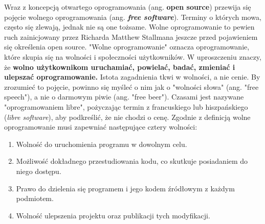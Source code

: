 \documentclass{article}
\begin{document}
\hspace{4mm} Wraz z koncepcją otwartego oprogramowania (ang. \textbf{open source}) przewija się pojęcie wolnego oprogramowania (ang. \textbf{\emph{free software}}). Terminy o których mowa, często się zlewają, jednak nie są one tożsame. Wolne oprogramowanie to pewien ruch zainicjowany przez Richarda Matthew Stallmana jeszcze przed pojawieniem się określenia open source. "Wolne oprogramowanie" oznacza oprogramowanie, które skupia się na wolności i społeczności użytkowników. W uproszczeniu znaczy, że \textbf{wolno użytkownikom uruchamiać, powielać, badać, zmieniać i ulepszać oprogramowanie.} Istota zagadnienia tkwi w wolności, a nie cenie. By zrozumieć to pojęcie, powinno się myśleć o nim jak o "wolności słowa" (ang. "free speech"), a nie o darmowym piwie (ang. "free beer"). Czasami jest nazywane "oprogramowaniem libre", pożyczając termin z francuskiego lub hiszpańskiego (\emph{libre software}), aby podkreślić, że nie chodzi o cenę\cite{gnu.free}. Zgodnie z definicją wolne oprogramowanie musi zapewniać następujące cztery wolności\cite{Webbink}:

\begin{enumerate}
    \item Wolność do uruchomienia programu w dowolnym celu.
    \item Możliwość dokładnego przestudiowania kodu, co skutkuje posiadaniem do niego dostępu.
    \item Prawo do dzielenia się programem i jego kodem źródłowym z każdym podmiotem.
    \item Wolność ulepszenia projektu oraz publikacji tych modyfikacji. 
\end{enumerate}
\end{document}
